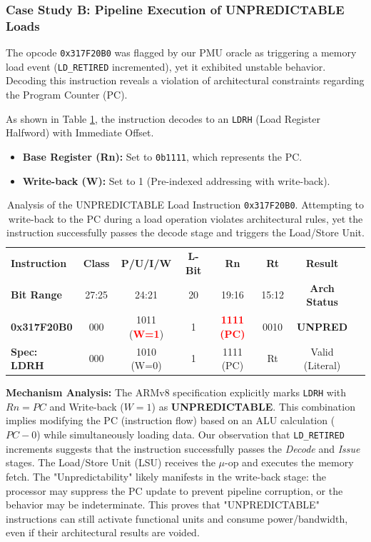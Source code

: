 \documentclass[pdflatex,sn-mathphys]{sn-jnl}%
\theoremstyle{thmstyleone}%
\theoremstyle{thmstyletwo}%
\theoremstyle{thmstylethree}%
\begin{document}
\subsubsection{Case Study B: Pipeline Execution of UNPREDICTABLE Loads}
The opcode \texttt{0x317F20B0} was flagged by our PMU oracle as triggering a memory load event (\texttt{LD\_RETIRED} incremented), yet it exhibited unstable behavior. Decoding this instruction reveals a violation of architectural constraints regarding the Program Counter (PC).

As shown in Table \ref{tab:ldrh_conflict}, the instruction decodes to an \texttt{LDRH} (Load Register Halfword) with Immediate Offset.
\begin{itemize}
    \item \textbf{Base Register (Rn):} Set to \texttt{0b1111}, which represents the PC.
    \item \textbf{Write-back (W):} Set to 1 (Pre-indexed addressing with write-back).
\end{itemize}

\begin{table}[h]
\centering
\caption{Analysis of the UNPREDICTABLE Load Instruction \texttt{0x317F20B0}. Attempting to write-back to the PC during a load operation violates architectural rules, yet the instruction successfully passes the decode stage and triggers the Load/Store Unit.}
\label{tab:ldrh_conflict}
\small %
\setlength{\tabcolsep}{3pt} %
\begin{tabular}{|l|c|c|c|c|c|c|c|}
\hline
\textbf{Instruction} & \textbf{Class} & \textbf{P/U/I/W} & \textbf{L-Bit} & \textbf{Rn} & \textbf{Rt} & \textbf{Result} \\ 
\textbf{Bit Range} & \scriptsize{27:25} & \scriptsize{24:21} & \scriptsize{20} & \scriptsize{19:16} & \scriptsize{15:12} & \textbf{Arch Status} \\ \hline
\rowcolor{gray!10} 
\textbf{0x317F20B0} & 000 & 1011 (\textbf{\textcolor{red}{W=1}}) & 1 & \textbf{\textcolor{red}{1111 (PC)}} & 0010 & \textbf{UNPRED} \\ \hline
\textbf{Spec: LDRH} & 000 & 1010 (W=0) & 1 & 1111 (PC) & Rt & Valid (Literal) \\ \hline
\end{tabular}
\end{table}

\textbf{Mechanism Analysis:} The ARMv8 specification explicitly marks \texttt{LDRH} with $Rn=PC$ and Write-back ($W=1$) as \textbf{UNPREDICTABLE}. This combination implies modifying the PC (instruction flow) based on an ALU calculation ($PC - 0$) while simultaneously loading data. 
Our observation that \texttt{LD\_RETIRED} increments suggests that the instruction successfully passes the \textit{Decode} and \textit{Issue} stages. The Load/Store Unit (LSU) receives the $\mu$-op and executes the memory fetch. The "Unpredictability" likely manifests in the write-back stage: the processor may suppress the PC update to prevent pipeline corruption, or the behavior may be indeterminate. This proves that "UNPREDICTABLE" instructions can still activate functional units and consume power/bandwidth, even if their architectural results are voided.
\end{document}
